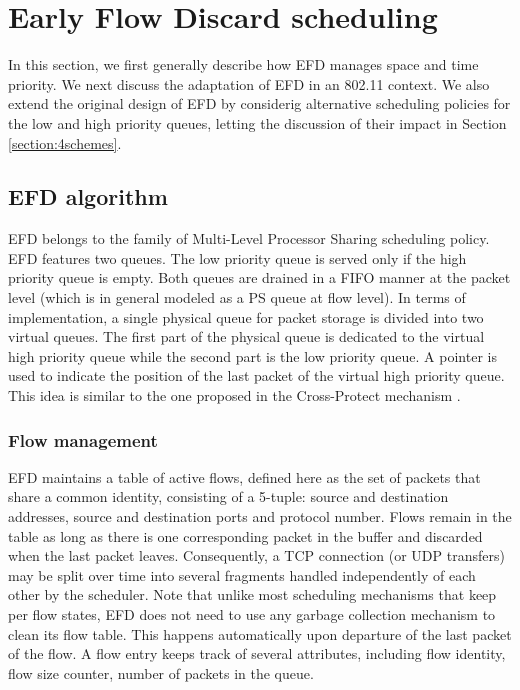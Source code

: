 \documentclass[preprint,12pt]{elsarticle}
\begin{document}
\section{Early Flow Discard scheduling}
\label{sec:efd_alg}

In this section, we first generally describe how EFD manages space and time priority. We next discuss the adaptation of EFD in an 802.11 context. We also extend the original design of EFD by considerig alternative scheduling policies for the low and high priority queues, letting the discussion of their impact in Section \ref{section:4schemes}. 

\subsection{EFD algorithm}
EFD belongs to the family of Multi-Level Processor Sharing scheduling policy. EFD features two queues. The low priority queue is served only if the high priority queue is empty. Both queues are drained in a FIFO manner at the packet level (which is in general modeled as a PS queue at flow level). In terms of implementation, a single physical queue for packet storage is divided into two virtual queues. The first part of the physical queue is dedicated to the virtual high priority queue while the second part is the low priority queue. A pointer is used to indicate the position of the last packet of the virtual high priority queue. This idea is similar to the one proposed in the Cross-Protect mechanism \cite{Kortebi04Xprotect}. %

\subsubsection{Flow management}
EFD maintains a table of active flows, defined here as the set of packets that share a common identity, consisting of a 5-tuple: source and destination addresses, source and destination ports and protocol number. Flows remain in the table as long as there is one corresponding packet in the buffer and discarded when the last packet leaves. Consequently, a TCP connection (or UDP transfers) may be split over time into several fragments handled independently of each other by the scheduler. Note that unlike most scheduling mechanisms that keep per flow states, EFD does not need to use any garbage collection mechanism to clean its flow table. This happens automatically upon departure of the last packet of the flow. A flow entry keeps track of several attributes, including flow identity, flow size counter, number of packets in the queue. %
\end{document}
